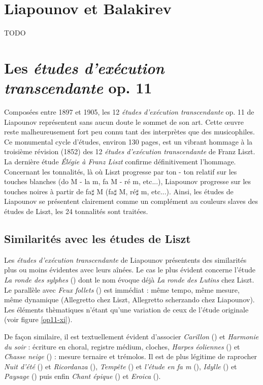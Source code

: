 \section{Liapounov et Balakirev}

TODO

\newpage
\newpage

\section{Les \emph{études d'exécution transcendante} op. 11}

Composées entre 1897 et 1905, les 12 \emph{études d'exécution transcendante} op. 11 de Liapounov représentent sans aucun doute le sommet de son art. Cette œuvre reste malheureusement fort peu connu tant des interprètes que des musicophiles. Ce monumental cycle d'études, environ 130 pages, est un vibrant hommage à la troisième révision (1852) des 12 \emph{études d'exécution transcendante} de Franz Liszt. La dernière étude \emph{Élégie à Franz Liszt} confirme définitivement l'hommage. Concernant les tonnalités, là où Liszt progresse par ton - ton relatif sur les touches blanches (do M - la m, fa M - ré m, etc...), Liapounov progresse sur les touches noires à partir de fa$\sharp$ M (fa$\sharp$ M, ré$\sharp$ m, etc...). Ainsi, les études de Liapounov se présentent clairement comme un complément au couleurs slaves des études de Liszt, les 24 tonnalités sont traitées.

\subsection{Similarités avec les études de Liszt}

Les \emph{études d'exécution transcendante} de Liapounov présentents des similarités plus ou moins évidentes avec leurs aînées. Le cas le plus évident concerne l'étude \emph{La ronde des sylphes} () dont le nom évoque déjà \emph{La ronde des Lutins} chez Liszt. Le parallèle avec \emph{Feux follets} () est immédiat : même tempo, même mesure, même dynamique (Allegretto chez Liszt, Allegretto scherzando chez Liapounov). Les éléments thèmatiques n'étant qu'une variation de ceux de l'étude originale (voir figure \ref{op11-xi}).

De façon similaire, il est textuellement évident d'associer \emph{Carillon} () et \emph{Harmonie du soir} : écriture en choral, registre médium, cloches, \emph{Harpes éoliennes} () et \emph{Chasse neige} () : mesure ternaire et trémolos. Il est de plus légitime de raprocher \emph{Nuit d'été} () et \emph{Ricordanza} (), \emph{Tempête} () et \emph{l'étude en fa m} (), \emph{Idylle} () et \emph{Paysage} () puis enfin \emph{Chant épique} () et \emph{Eroica} ().

